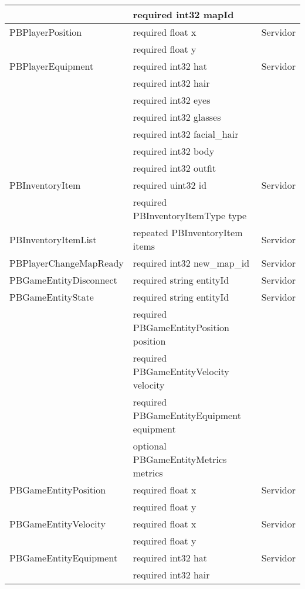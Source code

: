 \begin{longtable}{|p{}|p{}|p{}|}
                            & required int32 mapId & \\
    \hline
    PBPlayerPosition & required float x & Servidor \\
                        & required float y & \\
    \hline
    PBPlayerEquipment & required int32 hat & Servidor \\
                        & required int32 hair & \\
                        & required int32 eyes & \\
                        & required int32 glasses & \\
                        & required int32 facial\_hair & \\
                        & required int32 body & \\
                        & required int32 outfit & \\
    \hline
    PBInventoryItem & required uint32 id & Servidor \\
                    & required PBInventoryItemType type & \\
    \hline
    PBInventoryItemList & repeated PBInventoryItem items & Servidor \\
    \hline
    PBPlayerChangeMapReady & required int32 new\_map\_id & Servidor \\
    \hline
    PBGameEntityDisconnect & required string entityId & Servidor \\
    \hline
    PBGameEntityState & required string entityId & Servidor \\
                        & required PBGameEntityPosition position & \\
                        & required PBGameEntityVelocity velocity & \\
                        & required PBGameEntityEquipment equipment & \\
                        & optional PBGameEntityMetrics metrics & \\
    \hline
    PBGameEntityPosition & required float x & Servidor \\
                            & required float y & \\
    \hline
    PBGameEntityVelocity & required float x & Servidor \\
                            & required float y & \\
    \hline
    PBGameEntityEquipment & required int32 hat & Servidor \\
                            & required int32 hair & \\

\end{longtable}
